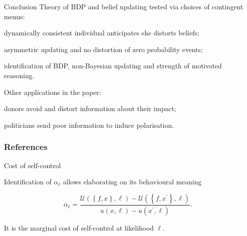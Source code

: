 \documentclass[usenames,dvipsnames,aspectratio=169,11pt, handout]{beamer}
\begin{document}
\begin{frame}{Conclusion}
	Theory of BDP and belief updating tested via choices of contingent menus:
	\vfill

	\begin{wideitemize}
		\item dynamically consistent individual anticipates she distorts beliefs;
		\item asymmetric updating and no distortion of zero probability events;
		\item identification of BDP, non-Bayesian updating and strength of motivated reasoning.
	\end{wideitemize}

	\vfill

	Other applications in the paper:

	\vfill

	\begin{wideitemize}
		\item donors avoid and distort information about their impact;
		\item politicians send poor information to induce polarisation.
	\end{wideitemize}

\end{frame}

\begin{frame}

	\frametitle{References}

	
	


\end{frame}

\appendix

\begin{frame}{Cost of self-control}\label{alpha}

	Identification of \( \alpha_{\ell} \) allows elaborating on its behavioural meaning

	\vfill

	\[
		\alpha_{\ell} = \frac{\mathcal{U} \left( \left\{f, x \right\}, \ell \right) - \mathcal{U} \left( \left\{f, x^{\prime} \right\}, \ell \right) }{u \left( x , \ell \right) - u \left( x^{\prime} , \ell \right)} .
	\]

	\vfill

	It is the marginal cost of self-control at likelihood \( \ell \). \hyperlink{fullmodel}{}

\end{frame}
\end{document}
